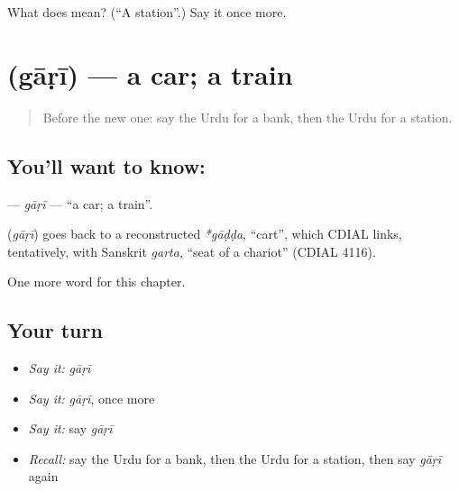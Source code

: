 \begin{tcolorbox}[breakable,colback=teal!4,colframe=teal!35!black,title={Before you move on}]
What does  mean? (\textquotedblleft{}A station\textquotedblright{}.) Say it once more.
\end{tcolorbox}
\section[\texorpdfstring{\ur{گاڑی} (gāṛī)}{گاڑی (gāṛī)}]{ (gāṛī) — a car; a train}

\label{lesson:UR-C80-gari}



\begin{quote}
Before the new one: say the Urdu for a bank, then the Urdu for a station.
\end{quote}

\subsection*{You'll want to know: }
\textbf{} — \emph{gāṛī} — \textquotedblleft{}a car; a train\textquotedblright{}.

\begin{cousinweb}
\textbf{} (\emph{gāṛī}) goes back to a reconstructed \emph{*gāḍḍa}, \textquotedblleft{}cart\textquotedblright{}, which CDIAL links, tentatively, with Sanskrit \emph{garta}, \textquotedblleft{}seat of a chariot\textquotedblright{} (CDIAL 4116).
\end{cousinweb}

\begin{grammarlens}[title={What you've built}]
One more word for this chapter.
\end{grammarlens}

\subsection*{Your turn}
\begin{itemize}
\raggedright
  \item \emph{Say it:} \emph{gāṛī}
  \item \emph{Say it:} \emph{gāṛī}, once more
  \item \emph{Say it:} say \emph{gāṛī}
  \item \emph{Recall:} say the Urdu for a bank, then the Urdu for a station, then say \emph{gāṛī} again
\end{itemize}

